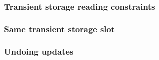 \subsubsection{Transient storage reading constraints \lispDone{}}    \label{hub: transient storage: specialized: reading}            
\subsubsection{Same transient storage slot           \lispDone{}}    \label{hub: transient storage: specialized: same slot}          
\subsubsection{Undoing updates                       \lispDone{}}    \label{hub: transient storage: specialized: undoing}            
